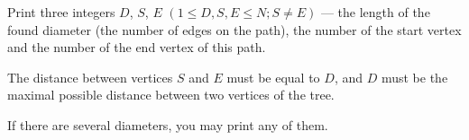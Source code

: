 Print three integers $D$, $S$, $E$ $(1 \le D, S, E \le N; S \neq E)$ --- the length of the found diameter (the number of edges on the path), the number of the start vertex and the number of the end vertex of this path.

The distance between vertices $S$ and $E$ must be equal to $D$, and $D$ must be the maximal possible distance between two vertices of the tree.

If there are several diameters, you may print any of them.
